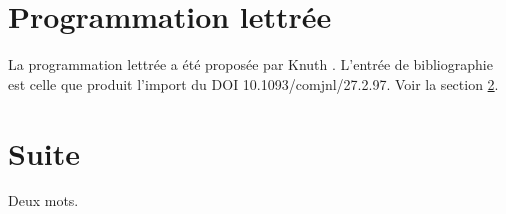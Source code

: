 \documentclass{article}
\begin{document}
\section{Programmation lettrée}
La programmation lettrée a été proposée par Knuth \cite{knuth1984literate}.
L'entrée de bibliographie est celle que produit l'import du DOI 10.1093/comjnl/27.2.97.
Voir la section \ref{sec:suite}.

\section{Suite}\label{sec:suite}
Deux mots.
\printbibliography
\end{document}

